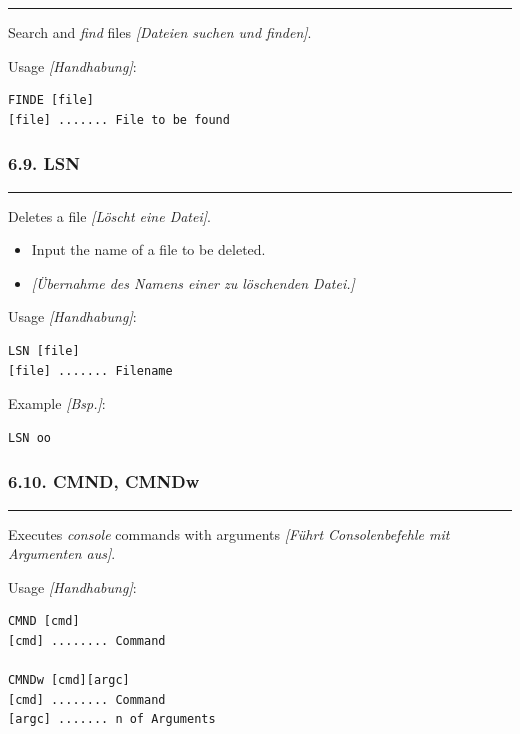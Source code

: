 \documentclass[
]{article}
\providecommand{\tightlist}{%
  \setlength{\itemsep}{0pt}\setlength{\parskip}{0pt}}
\begin{document}
\begin{center}\rule{0.5\linewidth}{0.5pt}\end{center}

Search and \emph{find} files \emph{{[}Dateien suchen und finden{]}}.

Usage \emph{{[}Handhabung{]}}:

\begin{verbatim}
FINDE [file]
[file] ....... File to be found
\end{verbatim}

\hypertarget{lsn}{%
\subsubsection{6.9. LSN}\label{lsn}}

\begin{center}\rule{0.5\linewidth}{0.5pt}\end{center}

Deletes a file \emph{{[}Löscht eine Datei{]}}.

\begin{itemize}
\tightlist
\item
  Input the name of a file to be deleted.
\item
  \emph{{[}Übernahme des Namens einer zu löschenden Datei.{]}}
\end{itemize}

Usage \emph{{[}Handhabung{]}}:

\begin{verbatim}
LSN [file] 
[file] ....... Filename 
\end{verbatim}

Example \emph{{[}Bsp.{]}}:

\begin{verbatim}
LSN oo
\end{verbatim}

\hypertarget{cmnd-cmndw}{%
\subsubsection{6.10. CMND, CMNDw}\label{cmnd-cmndw}}

\begin{center}\rule{0.5\linewidth}{0.5pt}\end{center}

Executes \emph{console} commands with arguments \emph{{[}Führt
Consolenbefehle mit Argumenten aus{]}}.

Usage \emph{{[}Handhabung{]}}:

\begin{verbatim}
CMND [cmd]
[cmd] ........ Command

CMNDw [cmd][argc]
[cmd] ........ Command
[argc] ....... n of Arguments
\end{verbatim}
\end{document}
